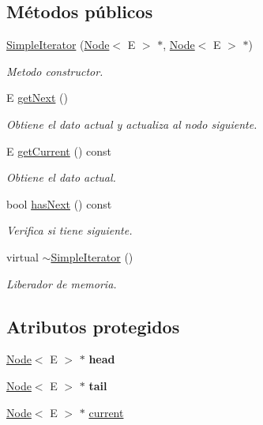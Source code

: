 \subsection*{Métodos públicos}
\begin{DoxyCompactItemize}
\item 
\hyperlink{classSimpleIterator_a643cab8769a566826092a5db6ace3267}{Simple\-Iterator} (\hyperlink{classNode}{Node}$<$ E $>$ $\ast$, \hyperlink{classNode}{Node}$<$ E $>$ $\ast$)
\begin{DoxyCompactList}\small\item\em Metodo constructor. \end{DoxyCompactList}\item 
E \hyperlink{classSimpleIterator_ab01032dba9ff4f1a1c47af3082b717d5}{get\-Next} ()
\begin{DoxyCompactList}\small\item\em Obtiene el dato actual y actualiza al nodo siguiente. \end{DoxyCompactList}\item 
E \hyperlink{classSimpleIterator_ac9460c98985a20f781f351c85b8a3ba2}{get\-Current} () const 
\begin{DoxyCompactList}\small\item\em Obtiene el dato actual. \end{DoxyCompactList}\item 
bool \hyperlink{classSimpleIterator_ab946b3d707e32d4d53f15af201ea2113}{has\-Next} () const 
\begin{DoxyCompactList}\small\item\em Verifica si tiene siguiente. \end{DoxyCompactList}\item 
\hypertarget{classSimpleIterator_a02203109d263581340152408ebb120a2}{virtual \hyperlink{classSimpleIterator_a02203109d263581340152408ebb120a2}{$\sim$\-Simple\-Iterator} ()}\label{classSimpleIterator_a02203109d263581340152408ebb120a2}

\begin{DoxyCompactList}\small\item\em Liberador de memoria. \end{DoxyCompactList}\end{DoxyCompactItemize}
\subsection*{Atributos protegidos}
\begin{DoxyCompactItemize}
\item 
\hypertarget{classSimpleIterator_a0403100ab86dba958115cea4147508a7}{\hyperlink{classNode}{Node}$<$ E $>$ $\ast$ {\bfseries head}}\label{classSimpleIterator_a0403100ab86dba958115cea4147508a7}

\item 
\hypertarget{classSimpleIterator_a9bfb7d6c12bc1e8031b5c0869026415a}{\hyperlink{classNode}{Node}$<$ E $>$ $\ast$ {\bfseries tail}}\label{classSimpleIterator_a9bfb7d6c12bc1e8031b5c0869026415a}

\item 
\hyperlink{classNode}{Node}$<$ E $>$ $\ast$ \hyperlink{classSimpleIterator_a7777fefe265a5067ec9319d8c1a3e278}{current}
\end{DoxyCompactItemize}
